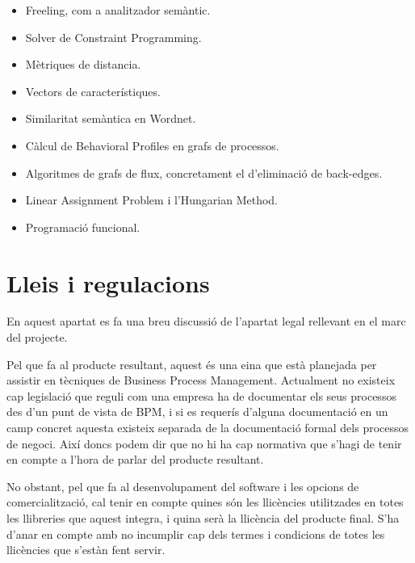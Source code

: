 \documentclass[10pt,a4paper]{article}
\begin{document}
\begin{itemize}
\item Freeling, com a analitzador semàntic.
\item Solver de Constraint Programming.
\item Mètriques de distancia.
\item Vectors de característiques.
\item Similaritat semàntica en Wordnet.
\item Càlcul de Behavioral Profiles en grafs de processos.
\item Algoritmes de grafs de flux, concretament el d'eliminació de back-edges.
\item Linear Assignment Problem i l'Hungarian Method.
\item Programació funcional.
\end{itemize}

\section{Lleis i regulacions}
\label{lleis}
En aquest apartat es fa una breu discussió de l'apartat legal rellevant en el marc del projecte.

Pel que fa al producte resultant, aquest és una eina que està planejada per assistir en tècniques de Business Process Management. Actualment no existeix cap legislació que reguli com una empresa ha de documentar els seus processos des d'un punt de vista de BPM, i si es requerís d'alguna documentació en un camp concret aquesta existeix separada de la documentació formal dels processos de negoci. Així doncs podem dir que no hi ha cap normativa que s'hagi de tenir en compte a l'hora de parlar del producte resultant.

No obstant, pel que fa al desenvolupament del software i les opcions de comercialització, cal tenir en compte quines són les llicències utilitzades en totes les llibreries que aquest integra, i quina serà la llicència del producte final. S'ha d'anar en compte amb no incumplir cap dels termes i condicions de totes les llicències que s'estàn fent servir. 

\printbibliography[heading=bibliography]{}
\end{document}
